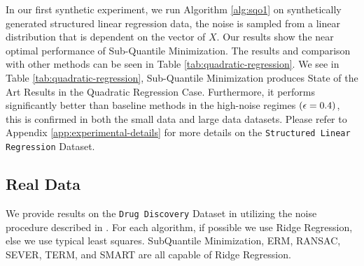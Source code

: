 \documentclass{article} %
\begin{document}
	In our first synthetic experiment, we run Algorithm \ref{alg:sqo1} on synthetically generated structured linear regression data, the noise is sampled from a linear distribution that is dependent on the vector of $X$. Our results show the near optimal performance of Sub-Quantile Minimization. The results and comparison with other methods can be seen in Table \ref{tab:quadratic-regression}. We see in Table \ref{tab:quadratic-regression}, Sub-Quantile Minimization produces State of the Art Results in the Quadratic Regression Case. Furthermore, it performs significantly better than baseline methods in the high-noise regimes $({\epsilon} = 0.4)$, this is confirmed in both the small data and large data datasets. Please refer to Appendix \ref{app:experimental-details} for more details on the \texttt{Structured Linear Regression} Dataset. 

	\subsection{Real Data}
	
	We provide results on the \texttt{Drug Discovery} Dataset in \cite{DiakonikolasKKLSS19} utilizing the noise procedure described in \cite{li2020tilted}. For each algorithm, if possible we use Ridge Regression, else we use typical least squares. SubQuantile Minimization, ERM, RANSAC, SEVER, TERM, and SMART are all capable of Ridge Regression. 
	
\end{document}
